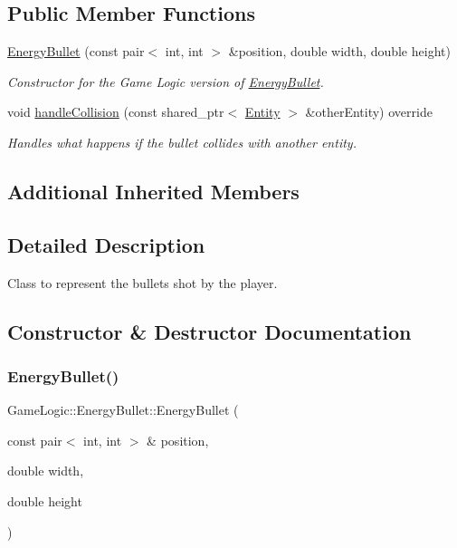\subsection*{Public Member Functions}
\begin{DoxyCompactItemize}
\item 
\hyperlink{classGameLogic_1_1EnergyBullet_a0186eb8346b81f63fb1c0e8312cbb583}{Energy\+Bullet} (const pair$<$ int, int $>$ \&position, double width, double height)
\begin{DoxyCompactList}\small\item\em Constructor for the Game Logic version of \hyperlink{classGameLogic_1_1EnergyBullet}{Energy\+Bullet}. \end{DoxyCompactList}\item 
void \hyperlink{classGameLogic_1_1EnergyBullet_a5eafebaf5fccf0a3bf3375def4ff32d2}{handle\+Collision} (const shared\+\_\+ptr$<$ \hyperlink{classGameLogic_1_1Entity}{Entity} $>$ \&other\+Entity) override
\begin{DoxyCompactList}\small\item\em Handles what happens if the bullet collides with another entity. \end{DoxyCompactList}\end{DoxyCompactItemize}
\subsection*{Additional Inherited Members}


\subsection{Detailed Description}
Class to represent the bullets shot by the player. 

\subsection{Constructor \& Destructor Documentation}
\mbox{\label{classGameLogic_1_1EnergyBullet_a0186eb8346b81f63fb1c0e8312cbb583}} 
\subsubsection{\texorpdfstring{Energy\+Bullet()}{EnergyBullet()}}
{\footnotesize\ttfamily Game\+Logic\+::\+Energy\+Bullet\+::\+Energy\+Bullet (\begin{DoxyParamCaption}\item[{const pair$<$ int, int $>$ \&}]{position,  }\item[{double}]{width,  }\item[{double}]{height }\end{DoxyParamCaption})}

